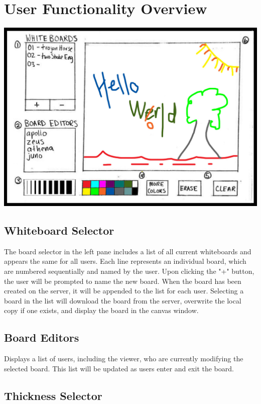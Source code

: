 \section{User Functionality Overview}

\includegraphics[keepaspectratio=1,width=6in]{img/gui-sketch.jpg}

\subsection{Whiteboard Selector}

The board selector in the left pane includes a list of all current whiteboards and appears the same for all users. Each line represents an individual board, which are numbered sequentially and named by the user. Upon clicking the "+" button, the user will be prompted to name the new board. When the board has been created on the server, it will be appended to the list for each user. Selecting a board in the list will download the board from the server, overwrite the local copy if one exists, and display the board in the canvas window. 

\subsection{Board Editors}

Displays a list of users, including the viewer, who are currently modifying the selected board. This list will be updated as users enter and exit the board.

\subsection{Thickness Selector}

